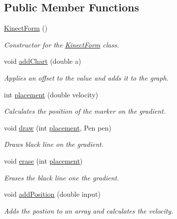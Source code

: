 \subsection*{Public Member Functions}
\begin{DoxyCompactItemize}
\item 
\hyperlink{classkinect_expirement_1_1_kinect_form_abbdd0294ee8b3f1bf396ee29c5b6243a}{Kinect\+Form} ()
\begin{DoxyCompactList}\small\item\em Constructor for the \hyperlink{classkinect_expirement_1_1_kinect_form}{Kinect\+Form} class. \end{DoxyCompactList}\item 
void \hyperlink{classkinect_expirement_1_1_kinect_form_aebdf926f8e92178f1ee0c6568fb51821}{add\+Chart} (double a)
\begin{DoxyCompactList}\small\item\em Applies an offset to the value and adds it to the graph. \end{DoxyCompactList}\item 
int \hyperlink{classkinect_expirement_1_1_kinect_form_aca91adeeaacdde85a2cb3369626744cf}{placement} (double velocity)
\begin{DoxyCompactList}\small\item\em Calculates the position of the marker on the gradient. \end{DoxyCompactList}\item 
void \hyperlink{classkinect_expirement_1_1_kinect_form_a76ca898e9b3e124df1276576fbb22227}{draw} (int \hyperlink{classkinect_expirement_1_1_kinect_form_aca91adeeaacdde85a2cb3369626744cf}{placement}, Pen pen)
\begin{DoxyCompactList}\small\item\em Draws black line on the gradient. \end{DoxyCompactList}\item 
void \hyperlink{classkinect_expirement_1_1_kinect_form_aa3555a49133e17a9019c174ce96ae4c3}{erase} (int \hyperlink{classkinect_expirement_1_1_kinect_form_aca91adeeaacdde85a2cb3369626744cf}{placement})
\begin{DoxyCompactList}\small\item\em Erases the black line one the gradient. \end{DoxyCompactList}\item 
void \hyperlink{classkinect_expirement_1_1_kinect_form_a272a8bf1c0f2ec1d7e9f3260d0e351c8}{add\+Position} (double input)
\begin{DoxyCompactList}\small\item\em Adds the postion to an array and calculates the velocity. \end{DoxyCompactList}\item 

\end{DoxyCompactItemize}
